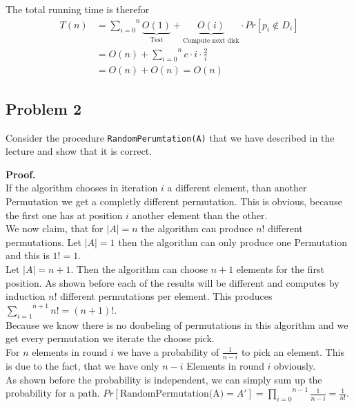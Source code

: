 \documentclass[11pt,a4paper,ngerman]{article}
\begin{document}
The total running time is therefor
\begin{equation*}\begin{split}
    T(n) &= \overset{n}{\underset{i=0}{\sum}} \underbrace{O(1)}_{\text{Test}} + \underbrace{O(i)}_{\text{Compute next disk}} \cdot Pr[p_i \not\in D_i]\\
        &= O(n) + \overset{n}{\underset{i=0}{\sum}} c \cdot i \cdot \frac{2}{i}\\
        &= O(n) + O(n) = O(n)
\end{split}\end{equation*}

\subsection*{Problem 2}

Consider the procedure \lstinline|RandomPerumtation(A)| that we have described in the lecture and show that it is correct.

\textbf{Proof.}\\

If the algorithm chooses in iteration $i$ a different element, than another Permutation we get a completly different
permutation. This is obvious, because the first one has at position $i$ another element than the other.\\

We now claim, that for $|A| = n$ the algorithm can produce $n!$ different permutations.
Let $|A| = 1$ then the algorithm can only produce one Permutation and this is $1! = 1$.\\

Let $|A| = n + 1$. Then the algorithm can choose
$n + 1$ elements for the first position. As shown before each of the results will be different and computes
by induction $n!$ different permutations per element.
This produces $\overset{n+1}{\underset{i=1}{\sum}} n! = (n+1)!$.\\

Because we know there is no doubeling of permutations in this algorithm and we get every permutation we iterate
the choose pick.\\

For $n$ elements in round $i$ we have a probability of $\frac{1}{n-i}$ to pick an element. This is due to the
fact, that we have only $n-i$ Elements in round $i$ obviously.\\

As shown before the probability is independent, we can simply sum up the probability for a path.
$Pr[\text{RandomPermutation(A)}=A'] = \overset{n-1}{\underset{i=0}{\prod}} \frac{1}{n-i} = \frac{1}{n!}$.
\end{document}
